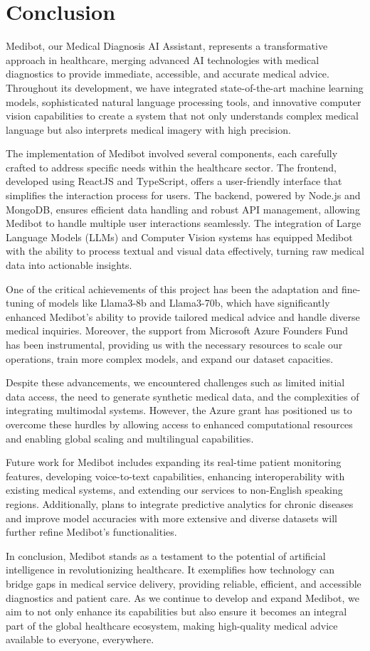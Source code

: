 \section{Conclusion}

Medibot, our Medical Diagnosis AI Assistant, represents a transformative approach in healthcare, merging advanced AI technologies with medical diagnostics to provide immediate, accessible, and accurate medical advice. Throughout its development, we have integrated state-of-the-art machine learning models, sophisticated natural language processing tools, and innovative computer vision capabilities to create a system that not only understands complex medical language but also interprets medical imagery with high precision.

The implementation of Medibot involved several components, each carefully crafted to address specific needs within the healthcare sector. The frontend, developed using ReactJS and TypeScript, offers a user-friendly interface that simplifies the interaction process for users. The backend, powered by Node.js and MongoDB, ensures efficient data handling and robust API management, allowing Medibot to handle multiple user interactions seamlessly. The integration of Large Language Models (LLMs) and Computer Vision systems has equipped Medibot with the ability to process textual and visual data effectively, turning raw medical data into actionable insights.

One of the critical achievements of this project has been the adaptation and fine-tuning of models like Llama3-8b and Llama3-70b, which have significantly enhanced Medibot's ability to provide tailored medical advice and handle diverse medical inquiries. Moreover, the support from Microsoft Azure Founders Fund has been instrumental, providing us with the necessary resources to scale our operations, train more complex models, and expand our dataset capacities.

Despite these advancements, we encountered challenges such as limited initial data access, the need to generate synthetic medical data, and the complexities of integrating multimodal systems. However, the Azure grant has positioned us to overcome these hurdles by allowing access to enhanced computational resources and enabling global scaling and multilingual capabilities.

Future work for Medibot includes expanding its real-time patient monitoring features, developing voice-to-text capabilities, enhancing interoperability with existing medical systems, and extending our services to non-English speaking regions. Additionally, plans to integrate predictive analytics for chronic diseases and improve model accuracies with more extensive and diverse datasets will further refine Medibot’s functionalities.

In conclusion, Medibot stands as a testament to the potential of artificial intelligence in revolutionizing healthcare. It exemplifies how technology can bridge gaps in medical service delivery, providing reliable, efficient, and accessible diagnostics and patient care. As we continue to develop and expand Medibot, we aim to not only enhance its capabilities but also ensure it becomes an integral part of the global healthcare ecosystem, making high-quality medical advice available to everyone, everywhere.
